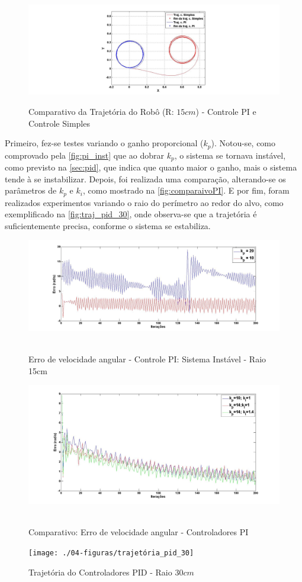 \begin{figure}[!htb]
	\centering
	\caption{Comparativo da Trajetória do Robô (R: $15cm$) - Controle PI e Controle Simples}
	\includegraphics[width=1.0\textwidth]{./04-figuras/traj_comparativo1}
	\label{fig:traj_comparativo1}
\end{figure}

Primeiro, fez-se testes variando o ganho proporcional ($k_{p}$). Notou-se, como comprovado pela \autoref{fig:pi_inst} que ao dobrar $k_{p}$, o sistema se tornava instável, como previsto na \autoref{sec:pid}, que indica que quanto maior o ganho, mais o sistema tende à se instabilizar. Depois, foi realizada uma comparação, alterando-se os parâmetros de $k_{p}$ e $k_{i}$, como mostrado na \autoref{fig:comparaivoPI}. E por fim, foram realizados experimentos variando o raio do perímetro ao redor do alvo, como exemplificado na \autoref{fig:traj_pid_30}, onde observa-se que a trajetória é suficientemente precisa, conforme o sistema se estabiliza. 
\begin{figure}[!htb]
	\centering
	\caption{Erro de velocidade angular - Controle PI: Sistema Instável - Raio 15cm}
	\includegraphics[width=1.0\textwidth]{./04-figuras/pi_inst}
	\
	\label{fig:pi_inst}
\end{figure}
\begin{figure}[!htb]
	\centering
	\caption{Comparativo: Erro de velocidade angular - Controladores PI}
	\includegraphics[width=1.0\textwidth]{./04-figuras/comparativoPI}
	\
	\label{fig:pi_inst}
\end{figure}

\begin{figure}[!htb]
	\centering
	\caption{Trajetória do Controladores PID - Raio $30cm$}
	\texttt{[image: ./04-figuras/trajetória\_pid\_30]}
	\
	\label{fig:traj_pid_30}
	\end{figure}

